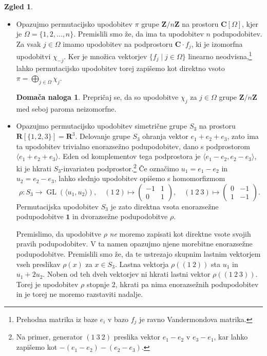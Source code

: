 \documentclass[11pt]{book}
\def\ZZ{\mathbf{Z}}
\def\RR{\mathbf{R}}
\def\CC{\mathbf{C}}
\def\oneone{\mathbf{1}}
\DeclareMathOperator\GL{GL}
\theoremstyle{definition}
\theoremstyle{zgled}
\newtheorem{zgled}[theorem]{Zgled}
\theoremstyle{zgledbrezstevilke}
\theoremstyle{odprtproblem}
\theoremstyle{domacanaloga}
\newtheorem{domacanaloga}[theorem]{Domača naloga}
\theoremstyle{izrek}
\begin{document}
\begin{zgled} \leavevmode
\begin{itemize}
    \item Opazujmo permutacijsko upodobitev $\pi$ grupe $\ZZ/n\ZZ$ na prostoru $\CC[\Omega]$, kjer je $\Omega = \{ 1, 2, \dots, n \}$. Premislili smo že, da ima ta upodobitev $n$ podupodobitev. Za vsak $j \in \Omega$ imamo upodobitev na podprostoru $\CC \cdot f_j$, ki je izomorfna upodobitvi $\chi_{-j}$. Ker je množica vektorjev $\{ f_j \mid j \in \Omega \}$ linearno neodvisna,\footnote{Prehodna matrika iz baze $e_i$ v bazo $f_j$ je ravno Vandermondova matrika.} lahko permutacijsko upodobitev torej zapišemo kot direktno vsoto $\pi = \bigoplus_{j \in \Omega} \chi_j$.
    
    \begin{domacanaloga}
        Prepričaj se, da so upodobitve $\chi_j$ za $j \in \Omega$ grupe $\ZZ/n\ZZ$ med seboj paroma neizomorfne.
    \end{domacanaloga}

    \item Opazujmo permutacijsko upodobitev simetrične grupe $S_3$ na prostoru $\RR[\{ 1,2,3 \}] = \RR^3$. Delovanje grupe $S_3$ ohranja vektor $e_1 + e_2 + e_3$, zato ima ta upodobitev trivialno enorazsežno podupodobitev, dano s podprostorom $\langle e_1 + e_2 + e_3 \rangle$. Eden od komplementov tega podprostora je $\langle e_1 - e_2, e_2 - e_3 \rangle$, ki je hkrati $S_3$-invariaten podprostor.\footnote{Na primer, generator $(1 \ 3 \ 2)$ preslika vektor $e_1 - e_2$ v $e_3 - e_1$, kar lahko zapišemo kot $-(e_1 - e_2) - (e_2 - e_3)$.} Če označimo $u_1 = e_1 - e_2$ in $u_2 = e_2 - e_3$, lahko slednjo upodobitev opišemo s homomorfizmom
    \[
        \rho \colon S_3 \to \GL(\langle u_1, u_2 \rangle), \quad
        (1 \ 2) \mapsto \begin{pmatrix} 
            -1 & 1 \\ 0 & 1 
        \end{pmatrix}, \quad
        (1 \ 2 \ 3) \mapsto \begin{pmatrix} 
            0 & -1 \\ 1 & -1
        \end{pmatrix}.
    \]
    Permutacijska upodobitev $S_3$ je zato direktna vsota enorazsežne podupodobitve $\oneone$ in dvorazsežne podupodobitve $\rho$. 
    
    Premislimo, da upodobitve $\rho$ \emph{ne} moremo zapisati kot direktne vsote svojih pravih podupodobitev. V ta namen opazujmo njene morebitne enorazsežne podupodobitve. Premislili smo že, da te ustrezajo skupnim lastnim vektorjem vseh preslikav $\rho(x)$ za $x \in S_3$. Lastna vektorja $\rho((1 \ 2))$ sta $u_1$ in $u_1 + 2 u_2$. Noben od teh dveh vektorjev ni hkrati lastni vektor $\rho((1 \ 2 \ 3))$. Torej je upodobitev $\rho$ stopnje $2$, hkrati pa nima enorazsežnih podupodobitev in je torej ne moremo razstaviti nadalje.
\end{itemize}
\end{zgled}
\end{document}
